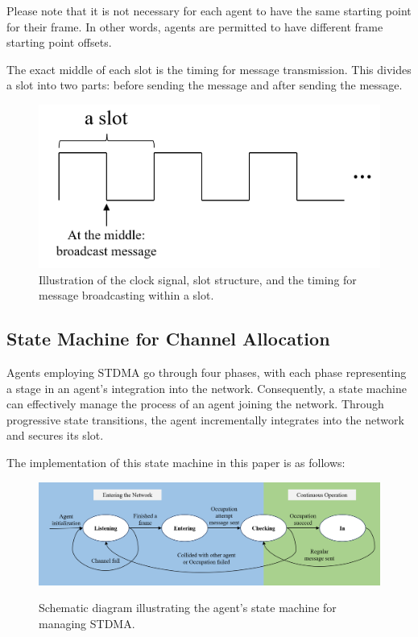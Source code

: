 
Please note that it is not necessary for each agent to have the same starting point for their frame. 
In other words, agents are permitted to have different frame starting point offsets.

The exact middle of each slot is the timing for message transmission.
This divides a slot into two parts: before sending the message and after sending the message.

\begin{figure}[htbp]
    \centering
    \includegraphics[width = 0.6\linewidth]{figures/slot_discretisation.png}
    \caption{Illustration of the clock signal, slot structure, and the timing for message broadcasting within a slot.}
    \label{fig:slot_discretization}
\end{figure}
\FloatBarrier

\subsection{State Machine for Channel Allocation}
\label{chap:stdma statemachine}

Agents employing STDMA go through four phases\cite{STDMA}, with each phase representing a stage in an agent's integration into the network. Consequently, a state machine can effectively manage the process of an agent joining the network. Through progressive state transitions, the agent incrementally integrates into the network and secures its slot.



The implementation of this state machine in this paper is as follows:


\begin{figure}[htbp]
    \centering
    \includegraphics[width = \linewidth]{figures/state_machine.png}
    \label{fig:state machine}
    \caption{Schematic diagram illustrating the agent's state machine for managing STDMA.} 
\end{figure}

